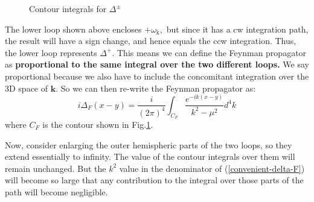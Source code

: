 \begin{figure}[H]

    \caption{Contour integrals for $\Delta^{\pm}$}
    \label{fig:delta-pm-contour}
\end{figure}
The lower loop shown above encloses $+\omega_{\mathrm{k}},$ but since it has a cw integration path, the result will have a sign change, and hence equals the ccw integration. Thus, the lower loop represents $\Delta^{+}$. This means we can define the Feynman propagator as \textbf{proportional to the same integral over the two different loops.} We say proportional because we also have to include the concomitant integration over the 3D space of $\mathbf{k}$. So we can then re-write the Feynman propagator as:
\begin{equation}
i \Delta_{F}(x-y)=\frac{i}{(2 \pi)^{4}} \int_{C_{F}} \frac{e^{-i k(x-y)}}{k^{2}-\mu^{2}} d^{4} k
\label{convenient-delta-F}
\end{equation}
where $C_F$ is the contour shown in Fig.\ref{fig:delta-pm-contour}.

Now, consider enlarging the outer hemispheric parts of the two loops, so they extend essentially to infinity. The value of the contour integrals over them will remain unchanged. But the $k^2$ value in the denominator of (\ref{convenient-delta-F}) will become so large that any contribution to the integral over those parts of the path will become negligible.

